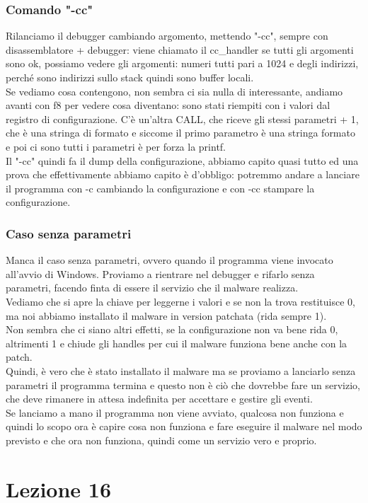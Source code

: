 \documentclass[12pt, oneside]{extbook}
\begin{document}
\subsection{Comando "-cc"}
Rilanciamo il debugger cambiando argomento, mettendo "-cc", sempre con disassemblatore +  debugger: viene chiamato il cc\_handler se tutti gli argomenti sono ok, possiamo vedere gli argomenti: numeri tutti pari a 1024 e degli indirizzi, perché sono indirizzi sullo stack quindi sono buffer locali.\\Se vediamo cosa contengono, non sembra ci sia nulla di interessante, andiamo avanti con f8 per vedere cosa diventano: sono stati riempiti con i valori dal registro di configurazione. C'è un'altra CALL, che riceve gli stessi parametri + 1, che è una stringa di formato e siccome il primo parametro è una stringa formato e poi ci sono tutti i parametri è per forza la printf.\\Il "-cc" quindi fa il dump della configurazione, abbiamo capito quasi tutto ed una prova che effettivamente abbiamo capito è d'obbligo: potremmo andare a lanciare il programma con -c cambiando la configurazione e con -cc stampare la configurazione.
\subsection{Caso senza parametri}
Manca il caso senza parametri, ovvero quando il programma viene invocato all'avvio di Windows. Proviamo a rientrare nel debugger e rifarlo senza parametri, facendo finta di essere il servizio che il malware realizza.\\Vediamo che si apre la chiave per leggerne i valori e se non la trova restituisce 0, ma noi abbiamo installato il malware in version patchata (rida sempre 1).\\Non sembra che ci siano altri effetti, se la configurazione non va bene rida 0, altrimenti 1 e chiude gli handles per cui il malware funziona bene anche con la patch.\\Quindi, è vero che è stato installato il malware ma se proviamo a lanciarlo senza parametri il programma termina e questo non è ciò che dovrebbe fare un servizio, che deve rimanere in attesa indefinita per accettare e gestire gli eventi.\\Se lanciamo a mano il programma non viene avviato, qualcosa non funziona e quindi lo scopo ora è capire cosa non funziona e fare eseguire il malware nel modo previsto e che ora non funziona, quindi come un servizio vero e proprio.
\chapter{Lezione 16}
\end{document}
